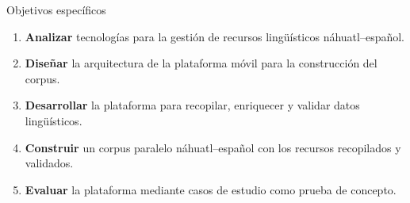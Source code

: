 \documentclass[aspectratio=169,10pt]{beamer}
\begin{document}
\begin{frame}[label=objetivos-especificos]
{Objetivos específicos}


\begin{enumerate}[<+->]
\setlength{\itemsep}{0.38cm}
\justifying

\item \textbf{Analizar} tecnologías para la gestión de recursos lingüísticos náhuatl–español.

\item \textbf{Diseñar} la arquitectura de la plataforma móvil para la construcción del corpus.

\item \textbf{Desarrollar} la plataforma para recopilar, enriquecer y validar datos lingüísticos.

\item \textbf{Construir} un corpus paralelo náhuatl–español con los recursos recopilados y validados.

\item \textbf{Evaluar} la plataforma mediante casos de estudio como prueba de concepto.

\end{enumerate}

\vfill


\end{frame}
\end{document}
